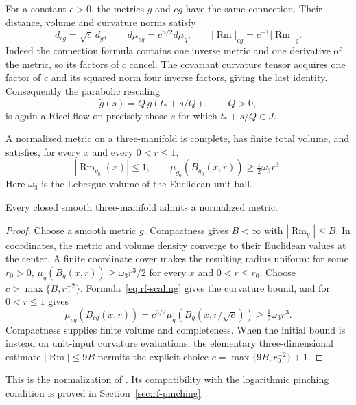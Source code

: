 For a constant $c>0$, the metrics $g$ and $cg$ have the same connection.
Their distance, volume and curvature norms satisfy
\begin{equation}\label{eq:rf-scaling}
 d_{cg}=\sqrt c\,d_g,\qquad d\mu_{cg}=c^{n/2}d\mu_g,\qquad
 |\operatorname{Rm}|_{cg}=c^{-1}|\operatorname{Rm}|_g.
\end{equation}
Indeed the connection formula contains one inverse metric and one
derivative of the metric, so its factors of $c$ cancel.  The covariant
curvature tensor acquires one factor of $c$ and its squared norm four
inverse factors, giving the last identity.  Consequently the parabolic
rescaling
\[
                    \widetilde g(s)=Q\,g(t_*+s/Q),\qquad Q>0,
\]
is again a Ricci flow on precisely those $s$ for which $t_*+s/Q\in J$.

\begin{definition}\label{def:rf-normalized}
A normalized metric on a three-manifold is complete, has finite total
volume, and satisfies, for every $x$ and every $0<r\leq1$,
\[
 |\operatorname{Rm}_{g_0}(x)|\leq1,\qquad
 \mu_{g_0}(B_{g_0}(x,r))\geq\tfrac12\omega_3r^3.
\]
Here $\omega_3$ is the Lebesgue volume of the Euclidean unit ball.
\end{definition}

\begin{proposition}\label{prop:rf-normalize}
Every closed smooth three-manifold admits a normalized metric.
\end{proposition}
\begin{proof}
Choose a smooth metric $g$.  Compactness gives $B<\infty$ with
$|\operatorname{Rm}_g|\leq B$.  In coordinates, the metric and volume
density converge to their Euclidean values at the center.  A finite
coordinate cover makes the resulting radius uniform: for some $r_0>0$,
$\mu_g(B_g(x,r))\geq\omega_3r^3/2$ for every $x$ and $0<r\leq r_0$.
Choose $c>\max\{B,r_0^{-2}\}$.  Formula~\eqref{eq:rf-scaling} gives the
curvature bound, and for $0<r\leq1$ gives
\[
 \mu_{cg}(B_{cg}(x,r))
 =c^{3/2}\mu_g(B_g(x,r/\sqrt c))\geq\tfrac12\omega_3r^3.
\]
Compactness supplies finite volume and completeness.  When the initial
bound is instead on unit-input curvature evaluations, the elementary
three-dimensional estimate $|\operatorname{Rm}|\leq9B$ permits the
explicit choice $c=\max\{9B,r_0^{-2}\}+1$.
\end{proof}
This is the normalization of \cite[Definition 4.10, p.~67]{MT2007}.
Its compatibility with the logarithmic pinching condition is proved in
Section~\ref{sec:rf-pinching}.

